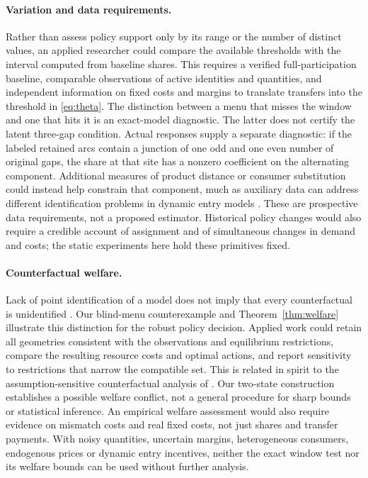 \documentclass[11pt]{article}
\begin{document}
\paragraph{Variation and data requirements.} Rather than assess policy support only by its range or the number of distinct values, an applied researcher could compare the available thresholds with the interval computed from baseline shares. This requires a verified full-participation baseline, comparable observations of active identities and quantities, and independent information on fixed costs and margins to translate transfers into the threshold in \eqref{eq:theta}. The distinction between a menu that misses the window and one that hits it is an exact-model diagnostic. The latter does not certify the latent three-gap condition. Actual responses supply a separate diagnostic: if the labeled retained arcs contain a junction of one odd and one even number of original gaps, the share at that site has a nonzero coefficient on the alternating component. Additional measures of product distance or consumer substitution could instead help constrain that component, much as auxiliary data can address different identification problems in dynamic entry models \citep{aguirregabiria2014}. These are prospective data requirements, not a proposed estimator. Historical policy changes would also require a credible account of assignment and of simultaneous changes in demand and costs; the static experiments here hold these primitives fixed.

\paragraph{Counterfactual welfare.} Lack of point identification of a model does not imply that every counterfactual is unidentified \citep{kalouptsidi2021}. Our blind-menu counterexample and Theorem~\ref{thm:welfare} illustrate this distinction for the robust policy decision. Applied work could retain all geometries consistent with the observations and equilibrium restrictions, compare the resulting resource costs and optimal actions, and report sensitivity to restrictions that narrow the compatible set. This is related in spirit to the assumption-sensitive counterfactual analysis of \citet{gu2026}. Our two-state construction establishes a possible welfare conflict, not a general procedure for sharp bounds or statistical inference. An empirical welfare assessment would also require evidence on mismatch costs and real fixed costs, not just shares and transfer payments. With noisy quantities, uncertain margins, heterogeneous consumers, endogenous prices or dynamic entry incentives, neither the exact window test nor its welfare bounds can be used without further analysis.
\end{document}
